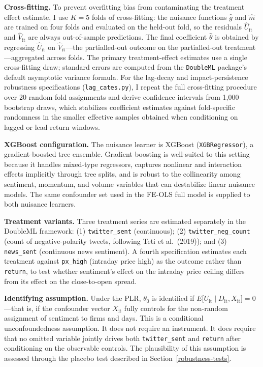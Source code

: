 \textbf{Cross-fitting.} To prevent overfitting bias from contaminating
the treatment effect estimate, I use \(K = 5\) folds of cross-fitting:
the nuisance functions \(\widehat{g}\) and \(\widehat{m}\) are trained
on four folds and evaluated on the held-out fold, so the residuals
\({\widehat{U}}_{\text{it}}\) and \({\widehat{V}}_{\text{it}}\) are
always out-of-sample predictions. The final coefficient
\(\widehat{\theta}\) is obtained by regressing
\({\widehat{U}}_{\text{it}}\) on \({\widehat{V}}_{\text{it}}\)---the
partialled-out outcome on the partialled-out treatment---aggregated
across folds. The primary treatment-effect estimates use a single
cross-fitting draw; standard errors are computed from the \texttt{DoubleML}
package's default asymptotic variance formula. For the lag-decay and
impact-persistence robustness specifications (\texttt{lag\_cates.py}),
I repeat the full cross-fitting procedure over 20 random fold assignments
and derive confidence intervals from 1,000 bootstrap draws, which
stabilizes coefficient estimates against fold-specific randomness in the
smaller effective samples obtained when conditioning on lagged or lead
return windows.

\textbf{XGBoost configuration.} The nuisance learner is XGBoost
(\texttt{XGBRegressor}), a gradient-boosted tree ensemble. Gradient
boosting is well-suited to this setting because it handles mixed-type
regressors, captures nonlinear and interaction effects implicitly
through tree splits, and is robust to the collinearity among sentiment,
momentum, and volume variables that can destabilize linear nuisance
models. The same confounder set used in the FE-OLS full model is
supplied to both nuisance learners.

\textbf{Treatment variants.} Three treatment series are estimated
separately in the DoubleML framework: (1) \texttt{twitter\_sent}
(continuous); (2) \texttt{twitter\_neg\_count} (count of
negative-polarity tweets, following Teti et al.\ (2019)); and (3)
\texttt{news\_sent} (continuous news sentiment). A fourth specification
estimates each treatment against \texttt{px\_high} (intraday price high)
as the outcome rather than \texttt{return}, to test whether sentiment's
effect on the intraday price ceiling differs from its effect on the
close-to-open spread.

\textbf{Identifying assumption.} Under the PLR, \(\theta_{0}\) is
identified if
\(E\lbrack U_{\text{it}} \mid D_{\text{it}},X_{\text{it}}\rbrack = 0\)---that
is, if the confounder vector \(X_{\text{it}}\) fully controls for the
non-random assignment of sentiment to firms and days. This is a
conditional unconfoundedness assumption. It does not require an
instrument. It does require that no omitted variable jointly drives both
\texttt{twitter\_sent} and \texttt{return} after conditioning on the
observable controls. The plausibility of this assumption is assessed
through the placebo test described in
Section~\ref{robustness-tests}.

